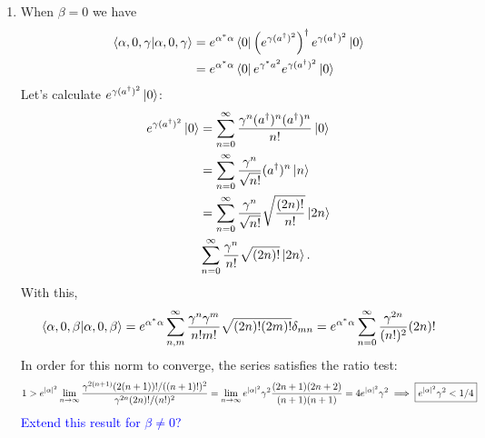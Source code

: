\documentclass{article}
\theoremstyle{definition}
\newcommand{\al}{\alpha}
\newcommand{\be}{\beta}
\newcommand{\f}[2]{\frac{#1}{#2}}
\newcommand{\lp}{\left(}
\newcommand{\rp}{\right)}
\begin{document}
\begin{enumerate}[label=(\alph*)]
	\item When $\be = 0$ we have
	\begin{align*}
	\braket{\al,0,\gamma} 
	&= e^{\al^* \al} \bra{0} \lp e^{\gamma(a^\dagger)^2}\rp^\dagger e^{\gamma(a^\dagger)^2} \ket{0} \\
	&= e^{\al^* \al}\bra{0} e^{\gamma^* a^2 } e^{\gamma (a^\dagger)^2} \ket{0}
	\end{align*} 
	Let's calculate $e^{\gamma (a^\dagger)^2}\ket{0}$:
	\begin{align*}
	e^{\gamma (a^\dagger)^2}\ket{0} 
	&= \sum^\infty_{n=0}\f{\gamma^n (a^\dagger)^n (a^\dagger)^n}{n!}\ket{0} \\
	&= \sum^\infty_{n=0}\f{\gamma^n}{\sqrt{n!}} (a^\dagger)^n \ket{n} \\
	&= \sum^\infty_{n=0}\f{\gamma^n}{\sqrt{n!}} \sqrt{\f{(2n)!}{n!}} \ket{2n} \\
	& \sum^\infty_{n=0} \f{\gamma^n}{n!} \sqrt{(2n)!} \ket{2n}.
	\end{align*}
	With this, 
	\begin{align*}
	\braket{\al,0,\be} = e^{\al^*\al}\sum^\infty_{n,m} \f{\gamma^n\gamma^m}{n!m!}\sqrt{(2n)!(2m)!}\delta_{mn} = e^{\al^*\al}\sum^\infty_{n=0} \f{\gamma^{2n}}{(n!)^2} (2n)!
	\end{align*}
	In order for this norm to converge, the series satisfies the ratio test:
	\begin{align*}
	1 > e^{\abs{\al}^2}\lim_{n\to \infty} \f{\gamma^{2(n+1)} (2(n+1))!/((n+1)!)^2}{\gamma^{2n} (2n)!/(n!)^2} = \lim_{n\to \infty}  e^{\abs{\al}^2}\gamma^2 \f{(2n+1)(2n+2)}{(n+1)(n+1)} = 4 e^{\abs{\al}^2}\gamma^2 \implies  \boxed{e^{\abs{\al}^2}\gamma^2 < 1/4}
	\end{align*}
	\textcolor{blue}{Extend this result for $\be \neq 0$?}
	

\end{enumerate}
\end{document}

